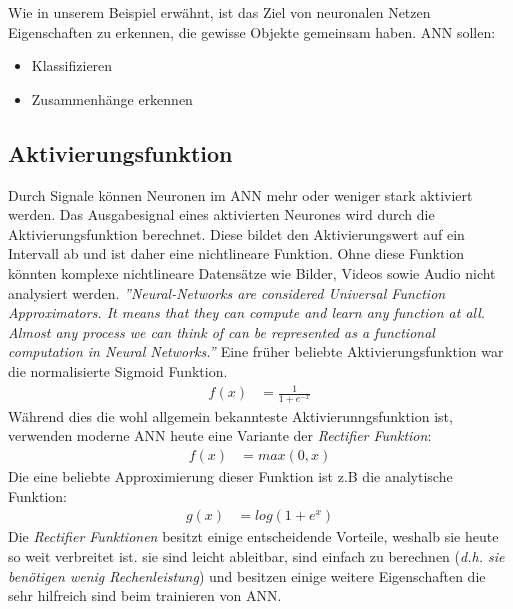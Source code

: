 \documentclass{thesisclass}
\begin{document}
Wie in unserem Beispiel erwähnt, ist das Ziel von neuronalen Netzen Eigenschaften zu erkennen, die gewisse Objekte gemeinsam haben. \gls{ANN} sollen:
\begin{itemize}
	\item Klassifizieren
	\item Zusammenhänge erkennen
\end{itemize}
\subsection{Aktivierungsfunktion}
Durch Signale können Neuronen im \gls{ANN} mehr oder weniger stark aktiviert werden. Das Ausgabesignal eines aktivierten Neurones wird durch die Aktivierungsfunktion berechnet. Diese bildet den Aktivierungswert auf ein Intervall ab und ist daher eine nichtlineare Funktion. Ohne diese Funktion könnten komplexe nichtlineare Datensätze wie Bilder, Videos sowie Audio nicht analysiert werden.
\newline 
\newline
\textit{''Neural-Networks are considered Universal Function Approximators. It means that they can compute and learn any function at all. Almost any process we can think of can be represented as a functional computation in Neural Networks.'' \cite{walia_2017}} 
\newline
Eine früher beliebte Aktivierungsfunktion war die normalisierte Sigmoid Funktion. 
\begin{align*}
f(x) &= \frac{1}{1 + e^{-x}}
\end{align*}
Während dies die wohl allgemein bekannteste Aktivierunngsfunktion ist, verwenden moderne \gls{ANN} heute eine Variante der \textit{Rectifier Funktion}\cite{lecun_bengio_hinton_2015}:
\begin{align*}
f(x) &= max(0, x)
\end{align*}
Die eine beliebte Approximierung dieser Funktion ist z.B die analytische Funktion:
\begin{align*}
g(x) &= log(1 + e^{x})
\end{align*}
Die \textit{Rectifier Funktionen} besitzt einige entscheidende Vorteile, weshalb sie heute so weit verbreitet ist. sie sind leicht ableitbar, sind einfach zu berechnen (\textit{d.h. sie benötigen wenig Rechenleistung}) und besitzen einige weitere Eigenschaften die sehr hilfreich sind beim trainieren von \gls{ANN}.
\end{document}
